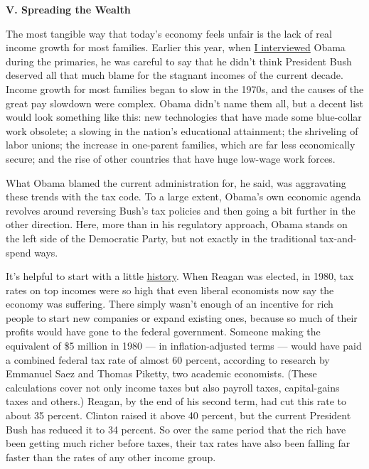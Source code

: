 \textbf{V. Spreading the Wealth}

The most tangible way that today's economy feels unfair is the lack of
real income growth for most families. Earlier this year, when
\href{http://www.nytimes.com/2008/02/02/us/politics/02obama.html?_r=1\&oref=slogin}{I
interviewed} Obama during the primaries, he was careful to say that he
didn't think President Bush deserved all that much blame for the
stagnant incomes of the current decade. Income growth for most families
began to slow in the 1970s, and the causes of the great pay slowdown
were complex. Obama didn't name them all, but a decent list would look
something like this: new technologies that have made some blue-collar
work obsolete; a slowing in the nation's educational attainment; the
shriveling of labor unions; the increase in one-parent families, which
are far less economically secure; and the rise of other countries that
have huge low-wage work forces.

What Obama blamed the current administration for, he said, was
aggravating these trends with the tax code. To a large extent, Obama's
own economic agenda revolves around reversing Bush's tax policies and
then going a bit further in the other direction. Here, more than in his
regulatory approach, Obama stands on the left side of the Democratic
Party, but not exactly in the traditional tax-and-spend ways.

It's helpful to start with a little
\href{http://elsa.berkeley.edu/~saez/piketty-saezJEP07taxprog.pdf}{history}.
When Reagan was elected, in 1980, tax rates on top incomes were so high
that even liberal economists now say the economy was suffering. There
simply wasn't enough of an incentive for rich people to start new
companies or expand existing ones, because so much of their profits
would have gone to the federal government. Someone making the equivalent
of \$5 million in 1980 --- in inflation-adjusted terms --- would have
paid a combined federal tax rate of almost 60 percent, according to
research by Emmanuel Saez and Thomas Piketty, two academic economists.
(These calculations cover not only income taxes but also payroll taxes,
capital-gains taxes and others.) Reagan, by the end of his second term,
had cut this rate to about 35 percent. Clinton raised it above 40
percent, but the current President Bush has reduced it to 34 percent. So
over the same period that the rich have been getting much richer before
taxes, their tax rates have also been falling far faster than the rates
of any other income group.

